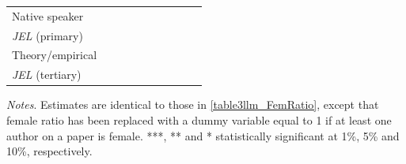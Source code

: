 \begin{table}
\begin{threeparttable}
\begin{tabular}{p{3cm}S@{}S@{}S@{}S@{}S@{}S@{}S@{}S@{}S@{}}
            Native speaker                &               &               &               &               &           {}   &           {}   &           {}   &           {}   &           {}   \\
            \textit{JEL} (primary)        &               &               &               &               &               &               &           {}   &               &               \\
            Theory/empirical              &               &               &               &               &               &               &               &           {}   &               \\
            \textit{JEL} (tertiary)       &               &               &               &               &               &               &               &               &           {}   \\
            \bottomrule
        \end{tabular}
        \begin{tablenotes}
            \tiny
            \item \textit{Notes}. Estimates are identical to those in \autoref{table3llm_FemRatio}, except that female ratio has been replaced with a dummy variable equal to 1 if at least one author on a paper is female. ***, ** and * statistically significant at 1\%, 5\% and 10\%, respectively.
        \end{tablenotes}
    \end{threeparttable}
\end{table}